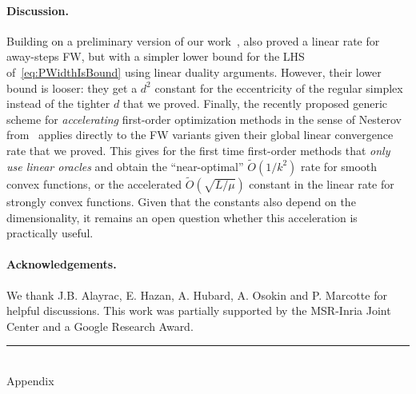 \documentclass{article} %
\newlength{\Sfloatsep}
\newlength{\Stextfloatsep}
\newlength{\Sintextsep}
\newcommand{\0}{\mathbf{0}} %
\begin{document}
\vspace{-2mm}
\paragraph{Discussion.}
Building on a preliminary version of our work~\citep{lacoste2013affine},
\citet{Beck:2015vo} also proved a linear rate for away-steps FW, but
with a simpler lower bound for the LHS of~\eqref{eq:PWidthIsBound} using
linear duality arguments. However, their lower bound
\citep[see e.g. Lemma 3.1 in][]{Beck:2015vo} is looser: they
get a $d^2$ constant for the eccentricity of the regular simplex instead
of the tighter $d$ that we proved. 
%
%
%
%
%
%
%
Finally, the recently proposed 
generic scheme for \emph{accelerating} first-order optimization 
methods in the sense of Nesterov from~\cite{lin2015catalyst}
applies directly to the FW variants given their global 
linear convergence rate that we proved.
This gives for the first time
first-order methods that \emph{only use linear oracles} 
and obtain the ``near-optimal'' $\tilde{O}(1/k^2)$ rate for smooth convex
functions, or the accelerated $\tilde{O}(\sqrt{L/\mu})$ constant in the
linear rate for strongly convex functions. Given that
the constants also depend on the dimensionality, 
it remains an open question whether this acceleration is 
practically useful.

\vspace{-3mm}
{\small \paragraph{Acknowledgements.}
We thank J.B. Alayrac, E. Hazan, A. Hubard, A. Osokin and P. Marcotte
for helpful discussions. This work was partially supported by the MSR-Inria Joint Center
and a Google Research Award.}
%
%
%
%
%
%
%
%
%
%
%
%
%
%

%
%
%
%
%
%
%
%
%
%
%
%
%
%
%
%
%
%
%
%
%
%
%
%
%
%
%
%

%
%





%
 
{\small

}%
%
%



%

\newpage
%
%
%
\appendix

%
\setlength{\floatsep}{\Sfloatsep}
\setlength{\textfloatsep}{\Stextfloatsep}
\setlength{\intextsep}{\Sintextsep}

\rule{\textwidth}{1pt}
~\\
{\huge Appendix}
\end{document}
